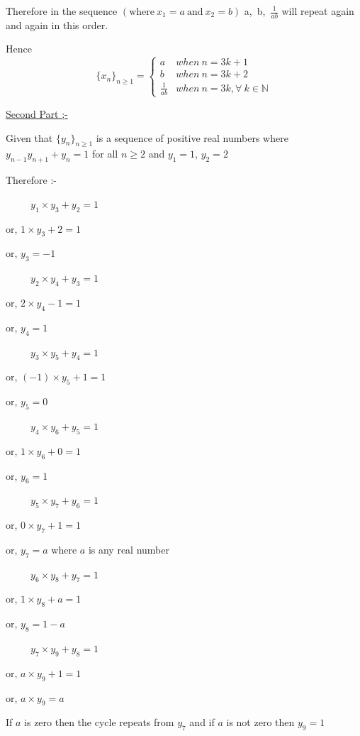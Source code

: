 \documentclass{article}
\begin{document}
\begin{enumerate}
 Therefore in the sequence $(\text{where}\ x_1=a\ \text{and}\ x_2=b)$ a,\ b,\ $\frac{1}{ab}$ will repeat again and again in this order.
  
 Hence
 \begin{equation}
   \{x_n \}_{n\geq 1}=  
     \begin{cases}
       a & when \ n=3k+1\\
       b & when  \ n=3k+2\\
       \frac{1}{ab} & when \  n=3k, \forall \  k\in \mathbb{N}
     \end{cases} 
 \end{equation}
 \bigskip
 
 \bigskip

\underline{Second Part ;-}

 Given that $\{y_n \}_{n\geq 1}$ is a sequence of positive real numbers where $y_{n-1}y_{n+1}+y_n=1$ for all $n\geq 2$ and $y_1=1$, $y_2=2$
 
Therefore :-

\ \ \ \ \ $y_1\times y_3 + y_2=1$
 
or, $1\times y_3+ 2=1$
 
 or, $y_3=-1$
 \bigskip
 
 \ \ \ \ \ $y_2\times y_4 + y_3=1$
 
 or, $2\times y_4-1=1$
 
 or, $y_4=1$
 \bigskip
 
  \ \ \ \ \ $y_3\times y_5 + y_4=1$
 
 or, $(-1)\times y_5+1=1$
 
 or, $y_5=0$
  \bigskip
 
 \ \ \ \ \ $y_4\times y_6 + y_5=1$
 
 or, $1\times y_6+0=1$
 
 or, $y_6=1$
  \bigskip
 
 \ \ \ \ \ $y_5\times y_7 + y_6=1$
 
 or, $0\times y_7+1=1$
 
 or, $y_7=a$ where $a$ is any real number
\bigskip
 
 \ \ \ \ \ $y_6\times y_8 + y_7=1$
 
 or, $1\times y_8+a=1$
 
 or, $y_8=1-a$
    \bigskip
 
 \ \ \ \ \ $y_7\times y_9 + y_8=1$
 
 or, $a\times y_9+1=1$
 
 or, $a\times y_9=a$
 
 If $a$ is zero then the cycle repeats from $y_7$ and if $a$ is not zero then $y_9=1$
 \bigskip
 

\end{enumerate}
\end{document}
